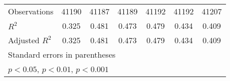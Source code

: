 {\begin{tabular}{l*{6}{c}}
\midrule
Observations        &       41190         &       41187         &       41189         &       41192         &       41192         &       41207         \\
\(R^{2}\)           &       0.325         &       0.481         &       0.473         &       0.479         &       0.434         &       0.409         \\
Adjusted \(R^{2}\)  &       0.325         &       0.481         &       0.473         &       0.479         &       0.434         &       0.409         \\
\bottomrule
\multicolumn{7}{l}{\footnotesize Standard errors in parentheses}\\
\multicolumn{7}{l}{\footnotesize \sym{*} \(p<0.05\), \sym{**} \(p<0.01\), \sym{***} \(p<0.001\)}\\
\end{tabular}
}
